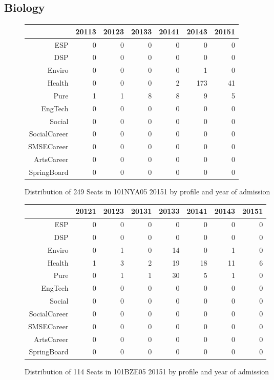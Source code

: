 \documentclass{article}\usepackage[]{graphicx}\usepackage[]{color}
\begin{document}
\subsection{Biology}
\begin{figure}[H]
\centering
\begin{tabular}{rrrrrrr}
  \hline
 & 20113 & 20123 & 20133 & 20141 & 20143 & 20151 \\ 
  \hline
ESP &   0 &   0 &   0 &   0 &   0 &   0 \\ 
  DSP &   0 &   0 &   0 &   0 &   0 &   0 \\ 
  Enviro &   0 &   0 &   0 &   0 &   1 &   0 \\ 
  Health &   0 &   0 &   0 &   2 & 173 &  41 \\ 
  Pure &   1 &   1 &   8 &   8 &   9 &   5 \\ 
  EngTech &   0 &   0 &   0 &   0 &   0 &   0 \\ 
  Social &   0 &   0 &   0 &   0 &   0 &   0 \\ 
  SocialCareer &   0 &   0 &   0 &   0 &   0 &   0 \\ 
  SMSECareer &   0 &   0 &   0 &   0 &   0 &   0 \\ 
  ArtsCareer &   0 &   0 &   0 &   0 &   0 &   0 \\ 
  SpringBoard &   0 &   0 &   0 &   0 &   0 &   0 \\ 
   \hline
\end{tabular}
\caption{Distribution of 249 Seats in 101NYA05 20151 by profile and year of admission} 
\end{figure}
\begin{figure}[H]
\centering
\begin{tabular}{rrrrrrrr}
  \hline
 & 20121 & 20123 & 20131 & 20133 & 20141 & 20143 & 20151 \\ 
  \hline
ESP &   0 &   0 &   0 &   0 &   0 &   0 &   0 \\ 
  DSP &   0 &   0 &   0 &   0 &   0 &   0 &   0 \\ 
  Enviro &   0 &   1 &   0 &  14 &   0 &   1 &   0 \\ 
  Health &   1 &   3 &   2 &  19 &  18 &  11 &   6 \\ 
  Pure &   0 &   1 &   1 &  30 &   5 &   1 &   0 \\ 
  EngTech &   0 &   0 &   0 &   0 &   0 &   0 &   0 \\ 
  Social &   0 &   0 &   0 &   0 &   0 &   0 &   0 \\ 
  SocialCareer &   0 &   0 &   0 &   0 &   0 &   0 &   0 \\ 
  SMSECareer &   0 &   0 &   0 &   0 &   0 &   0 &   0 \\ 
  ArtsCareer &   0 &   0 &   0 &   0 &   0 &   0 &   0 \\ 
  SpringBoard &   0 &   0 &   0 &   0 &   0 &   0 &   0 \\ 
   \hline
\end{tabular}
\caption{Distribution of 114 Seats in 101BZE05 20151 by profile and year of admission} 
\end{figure}
\end{document}
